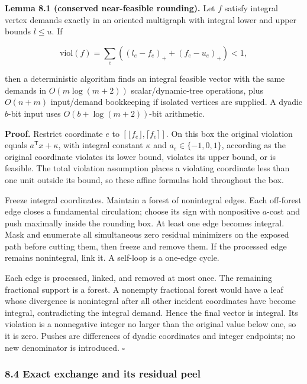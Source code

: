 \textbf{Lemma 8.1 (conserved near-feasible rounding).} Let \(f\) satisfy integral vertex demands exactly in an oriented multigraph with integral lower and upper bounds \(l\leq u\). If

\[
\mathrm{viol}(f)=
 \sum_e((l_e-f_e)_++(f_e-u_e)_+)<1,
 \tag{26}
\]

then a deterministic algorithm finds an integral feasible vector with the same demands in \(O(m\log(m+2))\) scalar/dynamic-tree operations, plus \(O(n+m)\) input/demand bookkeeping if isolated vertices are supplied. A dyadic \(b\)-bit input uses \(O(b+\log(m+2))\)-bit arithmetic.

\textbf{Proof.} Restrict coordinate \(e\) to \([\lfloor f_e\rfloor,\lceil f_e\rceil]\). On this box the original violation equals \(a^{\mathsf T}x+\kappa\), with integral constant \(\kappa\) and \(a_e\in\{-1,0,1\}\), according as the original coordinate violates its lower bound, violates its upper bound, or is feasible. The total violation assumption places a violating coordinate less than one unit outside its bound, so these affine formulas hold throughout the box.

Freeze integral coordinates. Maintain a forest of nonintegral edges. Each off-forest edge closes a fundamental circulation; choose its sign with nonpositive \(a\)-cost and push maximally inside the rounding box. At least one edge becomes integral. Mask and enumerate all simultaneous zero residual minimizers on the exposed path before cutting them, then freeze and remove them. If the processed edge remains nonintegral, link it. A self-loop is a one-edge cycle.

Each edge is processed, linked, and removed at most once. The remaining fractional support is a forest. A nonempty fractional forest would have a leaf whose divergence is nonintegral after all other incident coordinates have become integral, contradicting the integral demand. Hence the final vector is integral. Its violation is a nonnegative integer no larger than the original value below one, so it is zero. Pushes are differences of dyadic coordinates and integer endpoints; no new denominator is introduced. \hfill\(\square\)

\hypertarget{af-46593eb93e-exact-exchange-and-its-residual-peel}{%
\subsubsection{8.4 Exact exchange and its residual peel}\label{af-46593eb93e-exact-exchange-and-its-residual-peel}}

